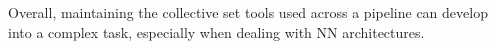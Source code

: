 Overall, maintaining the collective set tools used across a pipeline can develop into a complex task, especially when dealing with NN architectures.




